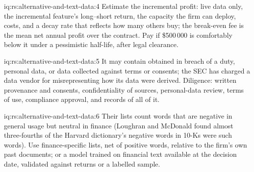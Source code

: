 \begin{solution}{iq:rs:alternative-and-text-data:4}
Estimate the incremental profit: live data only, the incremental feature's long--short return, the capacity the firm can deploy, costs, and a decay
rate that reflects how many others buy; the break-even fee is the mean net annual profit over the contract. Pay if \$500\,000 is comfortably below it
under a pessimistic half-life, after legal clearance.
\end{solution}

\begin{solution}{iq:rs:alternative-and-text-data:5}
It may contain  obtained in breach of a duty, personal data, or data collected against terms or consents; the SEC has
charged a data vendor for misrepresenting how its data were derived. Diligence: written provenance and consents, confidentiality of sources,
personal-data review, terms of use, compliance approval, and records of all of it.
\end{solution}

\begin{solution}{iq:rs:alternative-and-text-data:6}
Their lists count words that are negative in general usage but neutral in finance (Loughran and McDonald found almost three-fourths of the Harvard
dictionary's negative words in 10-Ks were such words). Use finance-specific lists, net of positive words, relative to the firm's own past documents;
or a model trained on financial text available at the decision date, validated against returns or a labelled sample.
\end{solution}
